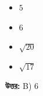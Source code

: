 \documentclass[12pt, a4paper]{article}
\begin{document}
\begin{itemize}[label={}, leftmargin=1cm, itemsep=0.5em]
    \item[\textbf{A)}] $5$
    \item[\textbf{B)}] $6$
    \item[\textbf{C)}] $\sqrt{20}$
    \item[\textbf{D)}] $\sqrt{17}$
\end{itemize}

\vspace{0.5em}
\begin{tcolorbox}[answerbox]
    \textbf{\color{success} উত্তর:} B) $6$
\end{tcolorbox}
\vspace{1em}
\end{document}
